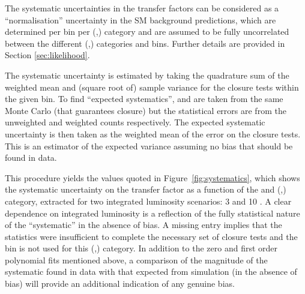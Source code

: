 The systematic uncertainties in the transfer factors can be considered
as a ``normalisation'' uncertainty in the SM background predictions,
which are determined per \scalht bin per (\njet,\nb) category and are
assumed to be fully uncorrelated between the different (\njet,\nb)
categories and \HT bins. Further details are provided in Section
\ref{sec:likelihood}. 

The systematic uncertainty is estimated by taking the quadrature sum
of the weighted mean and (square root of) sample variance for the
closure tests within the given \scalht bin. To find ``expected
systematics'', \nobs and \npre are taken from the same Monte Carlo
(that guarantees closure) but the statistical errors are from the
unweighted and weighted counts respectively. The expected systematic
uncertainty is then taken as the weighted mean of the error on the
closure tests. This is an estimator of the expected variance assuming
no bias that should be found in data. 

This procedure yields the values quoted in
Figure~\ref{fig:systematics}, which shows the systematic uncertainty
on the transfer factor as a function of the \HT and (\nb,\njet)
category, extracted for two integrated luminosity scenarios: 3 \ifb
and 10 \ifb. A clear dependence on integrated luminosity is a
reflection of the fully statistical nature of the ``systematic'' in
the absence of bias. A missing entry implies that the statistics were
insufficient to complete the necessary set of closure tests and the
\scalht bin is not used for this (\njet,\nb) category. In addition to
the zero and first order polynomial fits mentioned above, a comparison
of the magnitude of the systematic found in data with that expected
from simulation (\ie in the absence of bias) will provide an
additional indication of any genuine bias.

